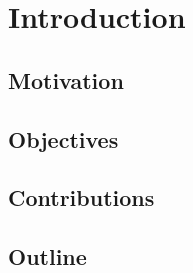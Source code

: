 \chapter{Introduction}

\section{Motivation}

\section{Objectives}

\section{Contributions}

\section{Outline}


